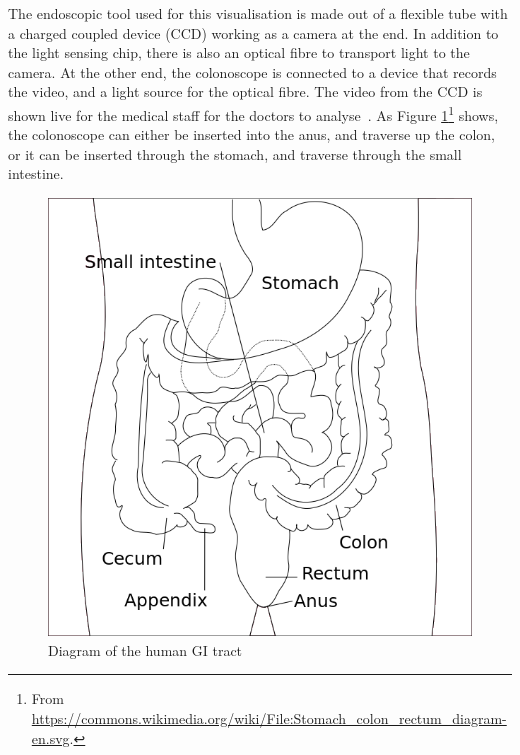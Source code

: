 The endoscopic tool used for this visualisation is made out of a flexible tube with a charged coupled device (CCD) working as a camera at the end. In addition to the light sensing chip, there is also an optical fibre to transport light to the camera. At the other end, the colonoscope is connected to a device that records the video, and a light source for the optical fibre. The video from the CCD is shown live for the medical staff for the doctors to analyse~\cite{Colonoscope}.
As Figure \ref{fig:HumanGI}\footnote{From \url{https://commons.wikimedia.org/wiki/File:Stomach_colon_rectum_diagram-en.svg}.} shows, the colonoscope can either be inserted into the anus, and traverse up the colon, or it can be inserted through the stomach, and traverse through the small intestine.


\begin{figure}[h]
	\centering
	\includegraphics[scale=0.4]{background/figures/Stomach_colon_rectum_diagram.png}
	\caption{Diagram of the human GI tract}
	\label{fig:HumanGI} 
\end{figure}





